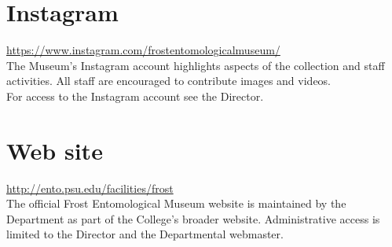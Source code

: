 \documentclass[letterpaper, 11pt]{article}
\begin{document}
\section{Instagram}
\url{https://www.instagram.com/frostentomologicalmuseum/}\\

The Museum's Instagram account highlights aspects of the collection and staff activities. All staff are encouraged to contribute images and videos.\\

\noindent{}For access to the Instagram account see the Director.

\section{Web site}
\url{http://ento.psu.edu/facilities/frost}\\

\noindent{}The official Frost Entomological Museum website is maintained by the Department as part of the College's broader website. Administrative access is limited to the Director and the Departmental webmaster.

%
%
\end{document}
